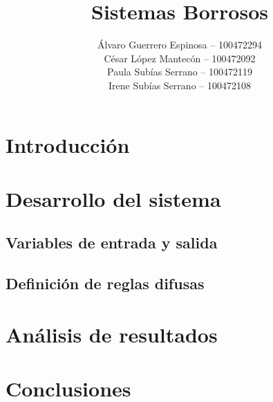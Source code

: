 \documentclass[es]{uc3mreport}
\author{
    Álvaro Guerrero Espinosa -- 100472294 \\
    César López Mantecón -- 100472092 \\
    Paula Subías Serrano -- 100472119 \\
    Irene Subías Serrano -- 100472108
}
\title{Sistemas Borrosos}
\begin{document}
  \makecover[new]

  \tableofcontents
  \listoffigures
  \listoftables

  \begin{report}

    \section{Introducción}
    \label{chap:intro}

    \section{Desarrollo del sistema}
    \label{chap:desarrollo}

    \subsection{Variables de entrada y salida}
    \subsection{Definición de reglas difusas}

    \section{Análisis de resultados}
    \label{chap:resultados}

    \section{Conclusiones}
    \label{chap:conclusion}

  \end{report}

  \label{bibliography}
  \printbibliography[title={Bibliografía}]  %

\end{document}
